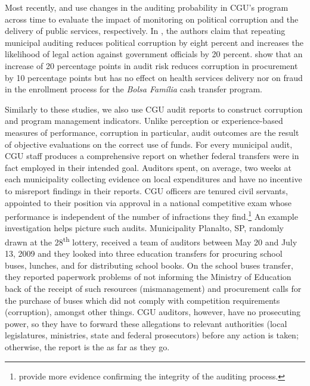 \documentclass[11pt]{article}
\begin{document}
Most recently, \citet{FinanGovernmentAuditsReduce2018} and \citet{ZamboniAuditRiskRent2018} use changes in the auditing probability in CGU's program across time to evaluate the impact of monitoring on political corruption and the delivery of public services, respectively. In \citet{FinanGovernmentAuditsReduce2018}, the authors claim that repeating municipal auditing reduces political corruption by eight percent and increases the likelihood of legal action against government officials by 20 percent. \citet{ZamboniAuditRiskRent2018} show that an increase of 20 percentage points in audit risk reduces corruption in procurement by 10 percentage points but has no effect on health services delivery nor on fraud in the enrollment process for the \emph{Bolsa Família} cash transfer program.

Similarly to these studies, we also use CGU audit reports to construct corruption and program management indicators. Unlike perception or experience-based measures of performance, corruption in particular, audit outcomes are the result of objective evaluations on the correct use of funds. For every municipal audit, CGU staff produces a comprehensive report on whether federal transfers were in fact employed in their intended goal. Auditors spent, on average, two weeks at each municipality collecting evidence on local expenditures and have no incentive to misreport findings in their reports. CGU officers are tenured civil servants, appointed to their position via approval in a national competitive exam whose performance is independent of the number of infractions they find.\footnote{\citet{FerrazExposingCorruptPoliticians2008b,FerrazElectoralAccountabilityCorruption2011a,ZamboniAuditRiskRent2018} provide more evidence confirming the integrity of the auditing process.} An example investigation helps picture such audits. Municipality Planalto, SP, randomly drawn at the 28\textsuperscript{th} lottery, received a team of auditors between May 20 and July 13, 2009 and they looked into three education transfers for procuring school buses, lunches, and for distributing school books. On the school buses transfer, they reported paperwork problems of not informing the Ministry of Education back of the receipt of such resources (mismanagement) and procurement calls for the purchase of buses which did not comply with competition requirements (corruption), amongst other things. CGU auditors, however, have no prosecuting power, so they have to forward these allegations to relevant authorities (local legislatures, ministries, state and federal prosecutors) before any action is taken; otherwise, the report is the as far as they go.
\end{document}
